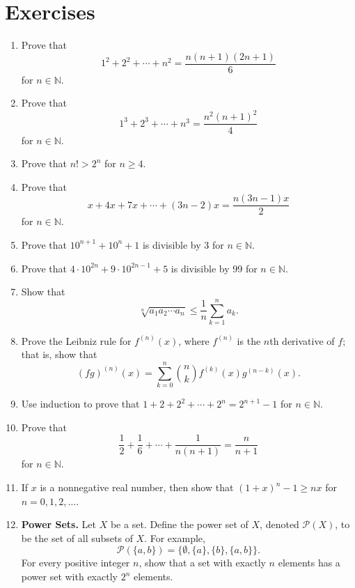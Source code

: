 \section*{Exercises}
\exrule

{\small
 
\begin{enumerate}
 
\item
Prove that
\[
1^2 + 2^2 + \cdots + n^2 = \frac{n(n + 1)(2n + 1)}{6}
\]
for $n \in {\mathbb N}$.

\item
Prove that
\[
1^3 + 2^3 + \cdots + n^3 = \frac{n^2(n + 1)^2}{4}
\]
for $n \in {\mathbb N}$.

\item
Prove that $n! > 2^n$ for $n \geq 4$.

\item
Prove that
\[
x + 4x + 7x + \cdots + (3n-2)x = \frac{n(3n - 1)x}{2}
\]
for $n \in {\mathbb N}$.

\item
Prove that $10^{n + 1} + 10^n + 1$ is divisible by 3 for $n \in {\mathbb N}$.

\item
Prove that $4 \cdot 10^{2n} + 9 \cdot 10^{2n - 1} + 5$ is divisible by 99 for $n \in {\mathbb N}$.

\item
Show that
\[
\sqrt[n]{a_1 a_2 \cdots a_n} \leq \frac{1}{n} \sum_{k = 1}^{n} a_k.
\]

\item
Prove the Leibniz rule for $f^{(n)} (x)$, where $f^{(n)}$ is the $n$th derivative of $f$; that is, show that 
\[
(fg)^{(n)} (x) = \sum_{k=0}^{n} \binom{n}{k} f^{(k)}(x) g^{(n-k)} (x).
\]

\item
Use induction to prove that $1 + 2 + 2^2 + \cdots + 2^n = 2^{n + 1} - 1$ for $n \in {\mathbb N}$. 

\item 
Prove that
\[
\frac{1}{2}+ \frac{1}{6} + \cdots + \frac{1}{n(n + 1)} = \frac{n}{n + 1} 
\]
for $n \in {\mathbb N}$.

\item 
If $x$ is a nonnegative real number, then show that $(1 + x)^n - 1 \geq nx$ for $n = 0, 1, 2, \ldots$. 
 
\item
{\bf Power Sets.} 
Let $X$ be a set.  Define the {\bfi power set\/} of $X$, denoted ${\mathcal P}(X)$\label{powerset}, to be the set of all subsets  of $X$.  For example,  
\[
{\mathcal P}( \{a, b\} ) = \{ \emptyset, \{a\}, \{b\}, \{a, b\} \}.
\]
For every positive integer $n$, show that a set with exactly $n$ elements has a power set with exactly $2^n$ elements.


\end{enumerate}}
